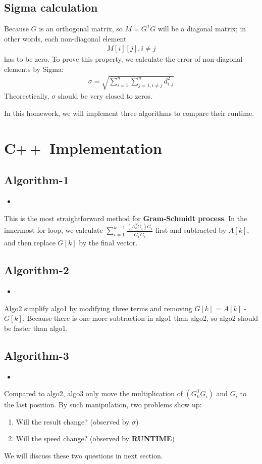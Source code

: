 \documentclass{article}
\newcommand{\cppscript}[2]{
\begin{itemize}
\item[]
\end{itemize}
}
\begin{document}
\subsection{Sigma calculation}
Because $G$ is an orthogonal matrix, so $M = G^TG$ will be a diagonal matrix; in other words, each non-diagonal element \newline
\begin{gather}
    M[i][j], i \neq j
\end{gather}
has to be zero. To prove this property, we calculate the error of non-diagonal elements by Sigma: \newline
\begin{gather}
    \sigma = \sqrt{\sum_{i=1}^{n}\sum_{j=1,i \neq j}^{n}d_{i,j}^2}
\end{gather}
Theorectically, $\sigma$ should be very closed to zeros. \newline \newline

In this homework, we will implement three algorithms to compare their runtime.
\newpage

\section{C$++$ Implementation}
\subsection{Algorithm-1}
\cppscript{src/algo1.cpp}{algo1 implementation}
This is the most straightforward method for \textbf{Gram-Schmidt process}. In the innermost for-loop, we calculate
$\sum_{i=1}^{k-1}{\frac{(A_k^TG_i)G_i}{G_i^TG_i}}$ first and subtracted by $A[k]$, and then replace $G[k]$ by the final vector. \newline

\subsection{Algorithm-2}
\cppscript{src/algo2.cpp}{algo2 implementation}
Algo2 simplify algo1 by modifying three terms and removing $G[k]$ = $A[k]$ - $G[k]$. Because there is one more subtraction in algo1 than
algo2, so algo2 should be faster than algo1.

\subsection{Algorithm-3}
\cppscript{src/algo3.cpp}{algo3 implementation}
\newpage
Compared to algo2, algo3 only move the multiplication of $(G_k^TG_i)$ and $G_i$ to the last position. By such manipulation, two problems
show up:
\begin{enumerate}
\item Will the result change? (observed by \boldmath$\sigma$) \\
    \item Will the speed change? (observed by \textbf{RUNTIME})
\end{enumerate}
We will discuss these two questions in next section.
\end{document}
